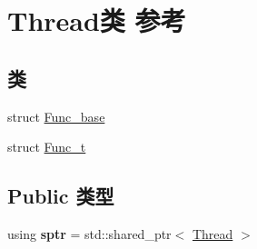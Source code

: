 \hypertarget{classThread}{}\section{Thread类 参考}
\label{classThread}
\subsection*{类}
\begin{DoxyCompactItemize}
\item 
struct \hyperlink{structThread_1_1Func__base}{Func\+\_\+base}
\item 
struct \hyperlink{structThread_1_1Func__t}{Func\+\_\+t}
\end{DoxyCompactItemize}
\subsection*{Public 类型}
\begin{DoxyCompactItemize}
\item 
\mbox{\label{classThread_a430059e402325caaf1ed185fb520c9d2}} 
using {\bfseries sptr} = std\+::shared\+\_\+ptr$<$ \hyperlink{classThread}{Thread} $>$
\end{DoxyCompactItemize}
